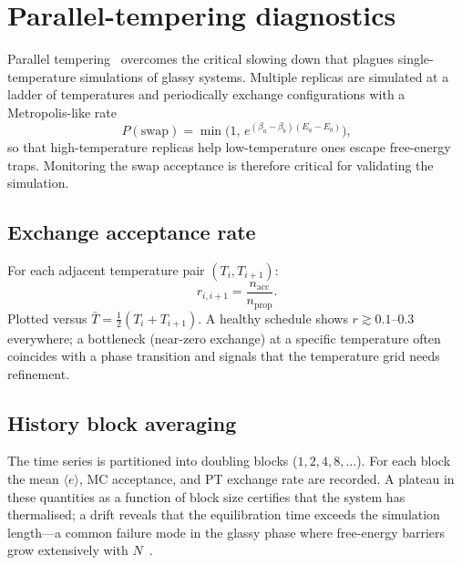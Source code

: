 \documentclass[11pt,a4paper]{article}
\newcommand{\avg}[1]{\langle #1 \rangle}
\begin{document}
\section{Parallel-tempering diagnostics}

Parallel tempering~\cite{HukushimaNemoto1996} overcomes the
critical slowing down that plagues single-temperature simulations
of glassy systems.  Multiple replicas are simulated at a ladder of
temperatures and periodically exchange configurations with a
Metropolis-like rate
\begin{equation}
  P(\text{swap}) = \min\bigl(1,\,e^{(\beta_a - \beta_b)(E_a - E_b)}\bigr),
\end{equation}
so that high-temperature replicas help low-temperature ones escape
free-energy traps.  Monitoring the swap acceptance is therefore
critical for validating the simulation.

\subsection{Exchange acceptance rate}
For each adjacent temperature pair $(T_i, T_{i+1})$:
\begin{equation}
  r_{i,i+1} = \frac{n_{\mathrm{acc}}}{n_{\mathrm{prop}}}.
\end{equation}
Plotted versus $\bar{T}=\tfrac{1}{2}(T_i + T_{i+1})$.  A healthy
schedule shows $r \gtrsim 0.1$--$0.3$ everywhere; a bottleneck
(near-zero exchange) at a specific temperature often coincides
with a phase transition and signals that the temperature grid needs
refinement.

\subsection{History block averaging}
The time series is partitioned into doubling blocks
($1, 2, 4, 8, \ldots$).  For each block the mean $\avg{e}$,
MC acceptance, and PT exchange rate are recorded.  A plateau
in these quantities as a function of block size certifies that
the system has thermalised; a drift reveals that the equilibration
time exceeds the simulation length---a common failure mode in
the glassy phase where free-energy barriers grow extensively
with $N$~\cite{MPV1987}.

\end{document}
